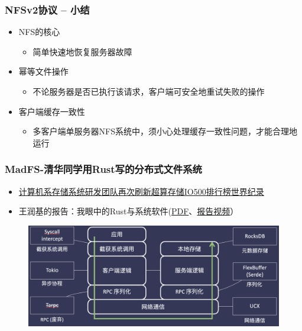 \begin{frame}[fragile]
    \frametitle{NFSv2协议 -- 小结}
    
        \begin{itemize}
            \item NFS的核心
            \begin{itemize}
                \item 简单快速地恢复服务器故障
            \end{itemize}
            \item 幂等文件操作
            \begin{itemize}
                \item 不论服务器是否已执行该请求，客户端可安全地重试失败的操作
            \end{itemize}
            \item 客户端缓存一致性
            \begin{itemize}
                \item 多客户端单服务器NFS系统中，须小心处理缓存一致性问题，才能合理地运行
            \end{itemize}
        \end{itemize}

\end{frame}
\begin{frame}[fragile]
    \frametitle{MadFS-清华同学用Rust写的分布式文件系统}
    \begin{itemize}
        \item \href{https://www.cs.tsinghua.edu.cn/info/1088/4532.htm}{计算机系存储系统研发团队再次刷新超算存储IO500排行榜世界纪录} \pause
        \item 王润基的报告：我眼中的Rust与系统软件(\href{https://lexiangla.com/teams/k100041/classes/6cc584c2f60211eb9714fe9a0679e97d/courses/b72ad2e2f99011eba321c6d7890bac21}{PDF}、\href{https://lexiangla.com/teams/k100041/classes/6cc584c2f60211eb9714fe9a0679e97d/courses/b74aac7af99011eb8f4ac6d7890bac21}{报告视频}）
    \end{itemize}
    \begin{figure}
        \includegraphics[width=0.8\linewidth]{figs/MadFS.png}
    \end{figure}
\end{frame}

